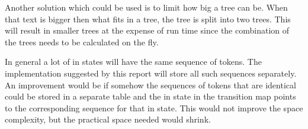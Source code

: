 Another solution which could be used is to limit how big a tree can be. When
that text is bigger then what fits in a tree, the tree is split into two trees.
This will result in smaller trees at the expense of run time since the
combination of the trees needs to be calculated on the fly.

In general a lot of in states will have the same sequence of tokens. The
implementation suggested by this report will store all such sequences
separately. An improvement would be if somehow the sequences of tokens that are
identical could be stored in a separate table and the in state in the transition
map points to the corresponding sequence for that in state. This would not
improve the space complexity, but the practical space needed would shrink.
